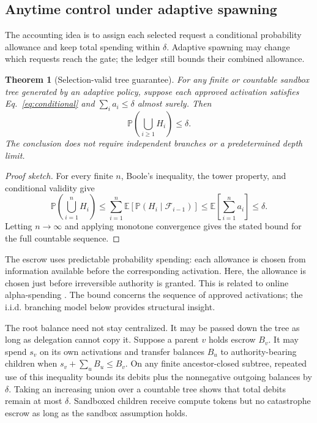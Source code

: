 \documentclass[sigconf,nonacm]{acmart}
\newtheorem{theorem}{Theorem}
\newcommand{\E}{\mathbb{E}}
\newcommand{\Prb}{\mathbb{P}}
\newcommand{\F}{\mathcal{F}}
\begin{document}
\subsection{Anytime control under adaptive spawning}

The accounting idea is to assign each selected request a conditional probability allowance and
keep total spending within $\delta$.  Adaptive spawning may change which requests reach the gate;
the ledger still bounds their combined allowance.

\begin{theorem}[Selection-valid tree guarantee]
For any finite or countable sandbox tree generated by an adaptive policy, suppose each approved
activation satisfies Eq.~\eqref{eq:conditional} and
$\sum_i a_i\leq\delta$ almost surely.  Then
\[
 \Prb\!\left(\bigcup_{i\geq1}H_i\right)\leq\delta .
\]
The conclusion does not require independent branches or a predetermined depth limit.
\end{theorem}

\begin{proof}[Proof sketch]
For every finite $n$, Boole's inequality, the tower property, and conditional validity give
\[
\Prb\!\left(\bigcup_{i=1}^{n}H_i\right)
\leq\sum_{i=1}^{n}\E[\Prb(H_i\mid\F_{i-1})]
\leq\E\!\left[\sum_{i=1}^{n}a_i\right]
\leq\delta.
\]
Letting $n\to\infty$ and applying monotone convergence gives the stated bound for the full
countable sequence.
\end{proof}

The escrow uses predictable probability spending: each allowance is chosen from information
available before the corresponding activation.  Here, the allowance is chosen just before
irreversible authority is granted.  This is related to online alpha-spending
\cite{weinstein2020online}.  The bound concerns the sequence of approved activations; the i.i.d.
branching model below provides structural insight.

The root balance need not stay centralized.  It may be passed down the tree as long as delegation
cannot copy it.  Suppose a parent $v$ holds escrow $B_v$.  It may spend $s_v$ on its own
activations and transfer balances $B_u$ to authority-bearing children when
$s_v+\sum_u B_u\leq B_v$.  On any finite ancestor-closed subtree, repeated use of this inequality
bounds its debits plus the nonnegative outgoing balances by $\delta$.  Taking an increasing union
over a countable tree shows that total debits remain at most $\delta$.  Sandboxed children receive
compute tokens but no catastrophe escrow as long as the sandbox assumption holds.
\end{document}

